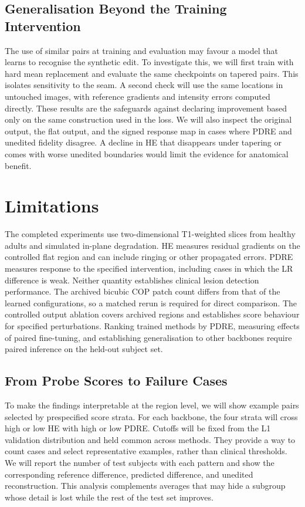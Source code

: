 \documentclass[journal]{IEEEtran}
\begin{document}
\subsection{Generalisation Beyond the Training Intervention}
The use of similar pairs at training and evaluation may favour a model that learns to recognise the synthetic edit. To investigate this, we will first train with hard mean replacement and evaluate the same checkpoints on tapered pairs. This isolates sensitivity to the seam. A second check will use the same locations in untouched images, with reference gradients and intensity errors computed directly. These results are the safeguards against declaring improvement based only on the same construction used in the loss. We will also inspect the original output, the flat output, and the signed response map in cases where PDRE and unedited fidelity disagree. A decline in HE that disappears under tapering or comes with worse unedited boundaries would limit the evidence for anatomical benefit.

\section{Limitations}
The completed experiments use two-dimensional T1-weighted slices from healthy adults and simulated in-plane degradation. HE measures residual gradients on the controlled flat region and can include ringing or other propagated errors. PDRE measures response to the specified intervention, including cases in which the LR difference is weak. Neither quantity establishes clinical lesion detection performance. The archived bicubic COP patch count differs from that of the learned configurations, so a matched rerun is required for direct comparison. The controlled output ablation covers \ControlRegions{} archived regions and establishes score behaviour for specified perturbations. Ranking trained methods by PDRE, measuring effects of paired fine-tuning, and establishing generalisation to other backbones require paired inference on the held-out subject set.


\subsection{From Probe Scores to Failure Cases}
To make the findings interpretable at the region level, we will show example pairs selected by prespecified score strata. For each backbone, the four strata will cross high or low HE with high or low PDRE. Cutoffs will be fixed from the L1 validation distribution and held common across methods. They provide a way to count cases and select representative examples, rather than clinical thresholds. We will report the number of test subjects with each pattern and show the corresponding reference difference, predicted difference, and unedited reconstruction. This analysis complements averages that may hide a subgroup whose detail is lost while the rest of the test set improves.
\end{document}

